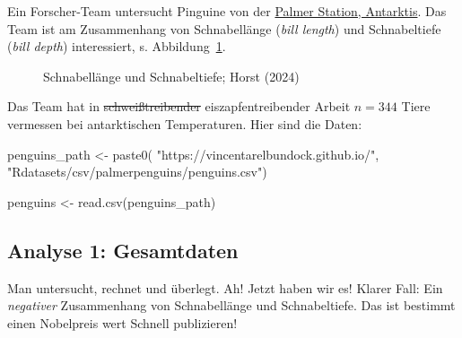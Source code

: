 \documentclass[
  letterpaper,
  oneside,
  open=any]{scrbook}
\newenvironment{Shaded}{\begin{snugshade}}{\end{snugshade}}
\newcommand{\FunctionTok}[1]{\textcolor[rgb]{0.28,0.35,0.67}{#1}}
\newcommand{\NormalTok}[1]{\textcolor[rgb]{0.00,0.23,0.31}{#1}}
\newcommand{\OtherTok}[1]{\textcolor[rgb]{0.00,0.23,0.31}{#1}}
\newcommand{\StringTok}[1]{\textcolor[rgb]{0.13,0.47,0.30}{#1}}
\theoremstyle{definition}
\theoremstyle{definition}
\theoremstyle{definition}
\theoremstyle{remark}
\begin{document}
Ein Forscher-Team untersucht Pinguine von der
\href{https://pallter.marine.rutgers.edu/}{Palmer Station, Antarktis}.
Das Team ist am Zusammenhang von Schnabellänge (\emph{bill length}) und
Schnabeltiefe (\emph{bill depth}) interessiert, s.
Abbildung~\ref{fig-peng-bill}.

\begin{figure}


\caption{\label{fig-peng-bill}Schnabellänge und Schnabeltiefe; Horst
(2024)}

\end{figure}%

Das Team hat in \st{schweißtreibender} eiszapfentreibender Arbeit
\(n=344\) Tiere vermessen bei antarktischen Temperaturen. Hier sind die
Daten:

\begin{Shaded}
\begin{Highlighting}[]
\NormalTok{penguins\_path }\OtherTok{\textless{}{-}} \FunctionTok{paste0}\NormalTok{(}
  \StringTok{"https://vincentarelbundock.github.io/"}\NormalTok{,}
  \StringTok{"Rdatasets/csv/palmerpenguins/penguins.csv"}\NormalTok{)}

\NormalTok{penguins }\OtherTok{\textless{}{-}} \FunctionTok{read.csv}\NormalTok{(penguins\_path)}
\end{Highlighting}
\end{Shaded}

\subsection{Analyse 1: Gesamtdaten}\label{analyse-1-gesamtdaten}

Man untersucht, rechnet und überlegt. Ah! Jetzt haben wir es! Klarer
Fall: Ein \emph{negativer} Zusammenhang von Schnabellänge und
Schnabeltiefe. Das ist bestimmt einen Nobelpreis wert Schnell
publizieren!
\end{document}
